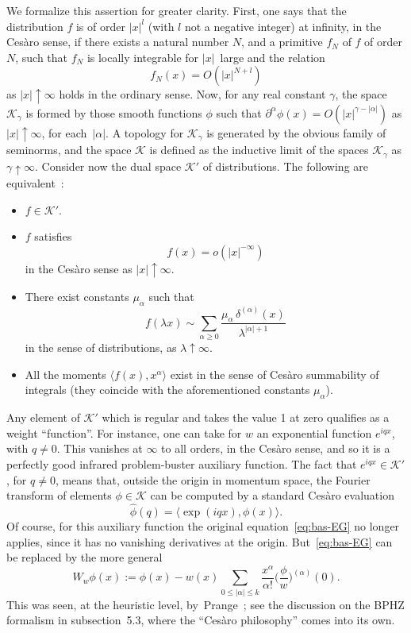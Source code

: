 \documentclass[a4paper,12pt]{article}
\renewcommand{\a}{\alpha}          %
\newcommand{\del}{\partial}        %
\newcommand{\dl}{\delta}           %
\newcommand{\ga}{\gamma}           %
\newcommand{\K}{\mathcal{K}}       %
\newcommand{\la}{\lambda}          %
\newcommand{\7}{\dagger}           %
\def\<#1,#2>{\langle#1,#2\rangle}  %
\theoremstyle{plain}
\theoremstyle{definition}
\begin{document}
We formalize this assertion for greater clarity. First, one says that
the distribution $f$ is of order $|x|^l$ (with $l$ not a negative
integer) at infinity, in the Ces\`aro sense, if there exists a natural
number $N$, and a primitive $f_N$ of $f$ of order $N$, such that $f_N$
is locally integrable for $|x|$~large and the relation
$$
f_N(x) = O(|x|^{N+l})
$$
as $|x| \uparrow\infty$ holds in the ordinary sense. Now, for any real
constant $\ga$, the space $\K_\ga$ is formed by those smooth functions
$\phi$ such that $\del^\a\phi(x) = O(|x|^{\ga - |\a|})$ as
$|x| \uparrow\infty$, for each~$|\a|$. A topology for $\K_\ga$ is
generated by the obvious family of seminorms, and the space $\K$ is
defined as the inductive limit of the spaces $\K_\ga$ as
$\ga \uparrow\infty$. Consider now the dual space $\K'$ of
distributions. The following are
equivalent~\cite{Odysseus,CesarRicardo}:
\vfill\eject
\begin{itemize}
\item
$f \in \K'$.
\item
$f$ satisfies
$$
f(x) = o(|x|^{-\infty})
$$
in the Ces\`aro sense as $|x| \uparrow \infty$.
\item
There exist constants $\mu_\a$ such that
$$
f(\la x) \sim \sum_{\a\geq0} \frac{\mu_\a\,\dl^{(\a)}(x)}{\la^{|\a|+1}}
$$
in the sense of distributions, as $\la \uparrow\infty$.
\item
All the moments $\<f(x), x^\a>$ exist in the sense of Ces\`aro
summability of integrals (they coincide with the aforementioned
constants $\mu_\a$).
\end{itemize}
Any element of $\K'$ which is regular and takes the value 1 at zero
qualifies as a weight ``function''. For instance, one can take for $w$
an exponential function $e^{iqx}$, with $q \neq 0$. This vanishes at
$\infty$ to all orders, in the Ces\`aro sense, and so it is a
perfectly good infrared problem-buster auxiliary function. The fact
that $e^{iqx} \in \K'$, for $q \neq 0$, means that, outside the origin
in momentum space, the Fourier transform of elements $\phi \in \K$ can
be computed by a standard Ces\`aro evaluation
$$
\hat\phi(q) = \<\exp(iqx), \phi(x)>.
$$
Of course, for this auxiliary function the original
equation~\eqref{eq:bas-EG} no longer applies, since it has no
vanishing derivatives at the origin. But~\eqref{eq:bas-EG} can be
replaced by the more general
\begin{equation}
W_w\phi(x) := \phi(x) - w(x) \sum_{0\leq|\a|\leq k} \frac{x^\a}{\a!}
\biggl( \frac{\phi}{w} \biggr)^{(\a)}(0).
\label{eq:bas-EGbis}
\end{equation}
This was seen, at the heuristic level, by~Prange~\cite{PrangeI}; see
the discussion on the BPHZ formalism in subsection~5.3, where the
``Ces\`aro philosophy'' comes into its own.
\end{document}
